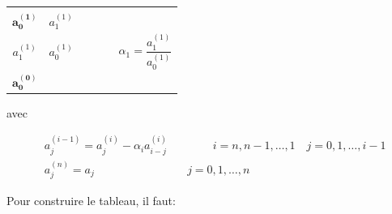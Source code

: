 \documentclass[11pt]{article}
\begin{document}
\begin{longtable}[]{@{}llllll@{}}
\begin{minipage}[t]{0.05\columnwidth}
\end{minipage}\tabularnewline
\begin{minipage}[t]{0.05\columnwidth}\raggedright\strut
\[ \mathbf{a_0^{(1)}} \]\strut
\end{minipage} & \begin{minipage}[t]{0.05\columnwidth}\raggedright\strut
\[ a_1^{(1)} \]\strut
\end{minipage} & \begin{minipage}[t]{0.05\columnwidth}\raggedright\strut
\strut
\end{minipage}\tabularnewline
\begin{minipage}[t]{0.05\columnwidth}\raggedright\strut
\[ a_1^{(1)} \]\strut
\end{minipage} & \begin{minipage}[t]{0.05\columnwidth}\raggedright\strut
\[ a_0^{(1)} \]\strut
\end{minipage} & \begin{minipage}[t]{0.05\columnwidth}\raggedright\strut
\strut
\end{minipage} & \begin{minipage}[t]{0.05\columnwidth}\raggedright\strut
\strut
\end{minipage} & \begin{minipage}[t]{0.05\columnwidth}\raggedright\strut
\strut
\end{minipage} & \begin{minipage}[t]{0.05\columnwidth}\raggedright\strut
\[ \alpha_1 = \frac{a_1^{(1)}}{a_0^{(1)}} \]\strut
\end{minipage}\tabularnewline
\begin{minipage}[t]{0.05\columnwidth}\raggedright\strut
\[ \mathbf{a_0^{(0)}} \]\strut
\end{minipage} & \begin{minipage}[t]{0.05\columnwidth}\raggedright\strut
\strut
\end{minipage}\tabularnewline
\bottomrule
\end{longtable}

avec

\begin{align}
  &a_j^{(i-1)} = a_j^{(i)} - \alpha_i a_{i-j}^{(i)} \qquad \qquad i = n, n-1, \dots, 1 \quad j = 0, 1, \dots, i-1 \\
  &a_j^{(n)} = a_j \qquad \qquad \qquad \qquad \, j = 0, 1, \dots, n
\end{align}

    Pour construire le tableau, il faut:
\end{document}
